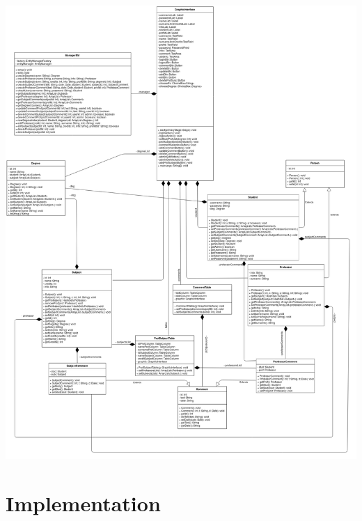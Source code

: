 \documentclass[a4paper, oneside]{article}
\begin{document}
\begin{minipage}{\linewidth}
\begin{center}
\vspace{1mm}
\includegraphics[width=155mm]{./images/diagrams/DesignUml.png} 
\vspace{2mm}
\label{fig:design_uml}
\end{center}
\end{minipage}

\clearpage


\section{Implementation}
\end{document}
